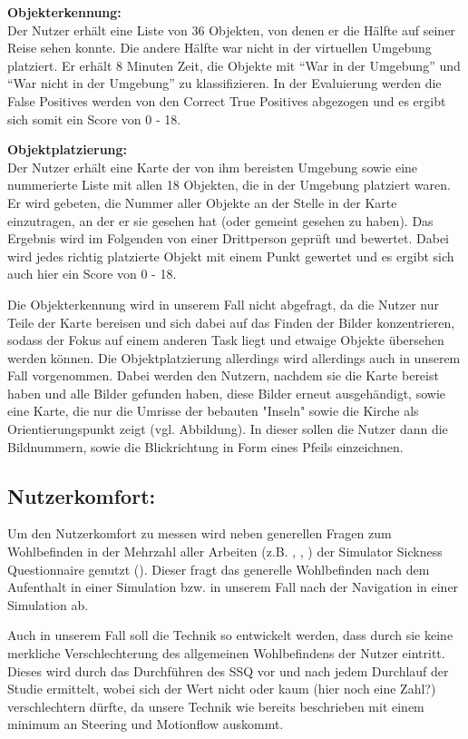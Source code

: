 \textbf{Objekterkennung:}\\
Der Nutzer erhält eine Liste von 36 Objekten, von denen er die Hälfte auf seiner Reise sehen konnte. Die andere Hälfte war nicht in der virtuellen Umgebung platziert. Er erhält 8 Minuten Zeit, die Objekte mit “War in der Umgebung” und “War nicht in der Umgebung” zu klassifizieren. In der Evaluierung werden die False Positives werden von den Correct True Positives abgezogen und es ergibt sich somit ein Score von 0 - 18.


\textbf{Objektplatzierung:}\\
Der Nutzer erhält eine Karte der von ihm bereisten Umgebung sowie eine nummerierte Liste mit allen 18 Objekten, die in der Umgebung platziert waren. 
Er wird gebeten, die Nummer aller Objekte an der Stelle in der Karte einzutragen, an der er sie gesehen hat (oder gemeint gesehen zu haben).
Das Ergebnis wird im Folgenden von einer Drittperson geprüft und bewertet.
Dabei wird jedes richtig platzierte Objekt mit einem Punkt gewertet und es ergibt sich auch hier ein Score von 0 - 18. 

Die Objekterkennung wird in unserem Fall nicht abgefragt, da die Nutzer nur Teile der Karte bereisen und sich dabei auf das Finden der Bilder konzentrieren, sodass der Fokus auf einem anderen Task liegt und etwaige Objekte übersehen werden können.
Die Objektplatzierung allerdings wird allerdings auch in unserem Fall vorgenommen. Dabei werden den Nutzern, nachdem sie die Karte bereist haben und alle Bilder gefunden haben, diese Bilder erneut ausgehändigt, sowie eine Karte, die nur die Umrisse der bebauten "Inseln" sowie die Kirche als Orientierungspunkt zeigt (vgl. Abbildung).
In dieser sollen die Nutzer dann die Bildnummern, sowie die Blickrichtung in Form eines Pfeils einzeichnen.


\subsection{Nutzerkomfort:}
Um den Nutzerkomfort zu messen wird neben generellen Fragen zum Wohlbefinden in der Mehrzahl aller Arbeiten (z.B. \cite{Krekhov2018GulliVR}, \cite{Suma2010EvaluationEnvironments}, \cite{Usoh1999WalkingEnvironments}) der Simulator Sickness Questionnaire genutzt (\cite{Kennedy1993SimulatorSickness}). Dieser fragt das generelle Wohlbefinden nach dem Aufenthalt in einer Simulation bzw. in unserem Fall nach der Navigation in einer Simulation ab.

Auch in unserem Fall soll die Technik so entwickelt werden, dass durch sie keine merkliche Verschlechterung des allgemeinen Wohlbefindens der Nutzer eintritt. Dieses wird durch das Durchführen des SSQ vor und nach jedem Durchlauf der Studie ermittelt, wobei sich der Wert nicht oder kaum (hier noch eine Zahl?) verschlechtern dürfte, da unsere Technik wie bereits beschrieben mit einem minimum an Steering und Motionflow auskommt.

